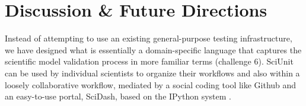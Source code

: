 \documentclass[9pt]{sig-alternate}
\newcommand{\verbx}[1]{\lstinline{#1}}
\begin{document}
%

\vspace{5px}
\section{Discussion \& Future Directions}\label{discussion}
Instead of attempting to use an existing general-purpose testing infrastructure, we have designed what is essentially a domain-specific language that captures the scientific model validation process in more familiar terms (challenge 6). SciUnit can be used by individual scientists to organize their workflows and also within a loosely collaborative workflow, mediated by a social coding tool like Github and an easy-to-use portal, SciDash, based on the IPython system \cite{perez2007ipython}.

\end{document}
